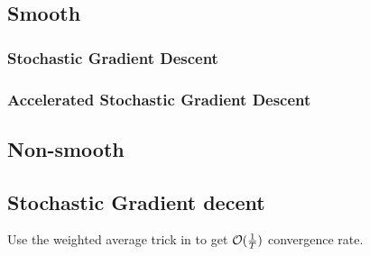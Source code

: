 \subsection{Smooth}

\subsubsection{Stochastic Gradient Descent}
\cite{li2019convergence}

\subsubsection{Accelerated Stochastic Gradient Descent}



\subsection{Non-smooth}
\subsection{Stochastic Gradient decent}

Use the weighted average trick in \cite{lacoste2012simpler}
to get ${\mathcal{O}}(\frac{1}{T})$ convergence rate. 





